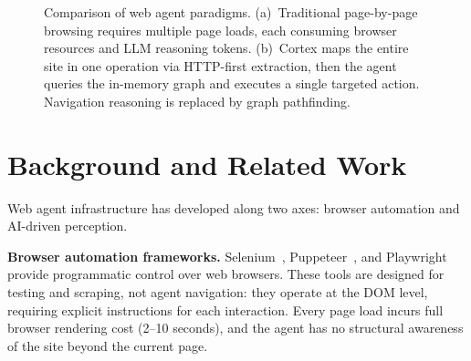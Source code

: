 \documentclass[10pt, twocolumn]{article}
\begin{document}
\begin{figure}[t]
\caption{Comparison of web agent paradigms. (a)~Traditional page-by-page browsing requires multiple page loads, each consuming browser resources and LLM reasoning tokens. (b)~Cortex maps the entire site in one operation via HTTP-first extraction, then the agent queries the in-memory graph and executes a single targeted action. Navigation reasoning is replaced by graph pathfinding.}
\label{fig:paradigm}
\end{figure}


\section{Background and Related Work}
\label{sec:related}

Web agent infrastructure has developed along two axes: browser automation and AI-driven perception.

\textbf{Browser automation frameworks.} Selenium~\cite{selenium2004}, Puppeteer~\cite{puppeteer2017}, and Playwright~\cite{playwright2020} provide programmatic control over web browsers. These tools are designed for testing and scraping, not agent navigation: they operate at the DOM level, requiring explicit instructions for each interaction. Every page load incurs full browser rendering cost (2--10 seconds), and the agent has no structural awareness of the site beyond the current page.
\end{document}
